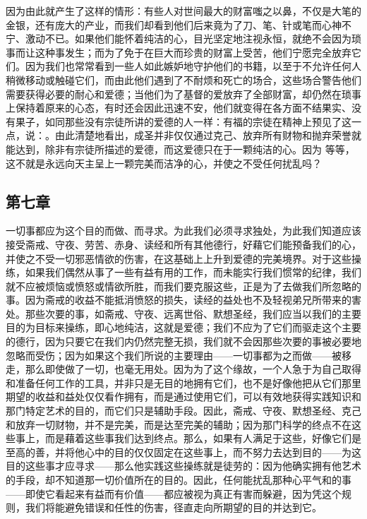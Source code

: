 因为由此就产生了这样的情形：有些人对世间最大的财富嗤之以鼻，不仅是大笔的金银，还有庞大的产业，而我们却看到他们后来竟为了刀、笔、针或笔而心神不宁、激动不已。如果他们能怀着纯洁的心，目光坚定地注视永恒，就绝不会因为琐事而让这种事发生；而为了免于在巨大而珍贵的财富上受苦，他们宁愿完全放弃它们。因为我们也常常看到一些人如此嫉妒地守护他们的书籍，以至于不允许任何人稍微移动或触碰它们，而由此他们遇到了不耐烦和死亡的场合，这些场合警告他们需要获得必要的耐心和爱德；当他们为了基督的爱放弃了全部财富，却仍然在琐事上保持着原来的心态，有时还会因此迅速不安，他们就变得在各方面不结果实、没有果子，如同那些没有宗徒所讲的爱德的人一样：有福的宗徒在精神上预见了这一点，说：。由此清楚地看出，成圣并非仅仅通过克己、放弃所有财物和抛弃荣誉就能达到，除非有宗徒所描述的爱德，而这爱德只在于一颗纯洁的心。因为 等等，这不就是永远向天主呈上一颗完美而洁净的心，并使之不受任何扰乱吗？\par


\subsection{第七章}

\par

一切事都应为这个目的而做、而寻求。为此我们必须寻求独处，为此我们知道应该接受斋戒、守夜、劳苦、赤身、读经和所有其他德行，好藉它们能预备我们的心，并使之不受一切邪恶情欲的伤害，在这基础上上升到爱德的完美境界。对于这些操练，如果我们偶然从事了一些有益有用的工作，而未能实行我们惯常的纪律，我们就不应被烦恼或愤怒或情欲所胜，而我们要克服这些，正是为了去做我们所忽略的事。因为斋戒的收益不能抵消愤怒的损失，读经的益处也不及轻视弟兄所带来的害处。那些次要的事，如斋戒、守夜、远离世俗、默想圣经，我们应当以我们的主要目的为目标来操练，即心地纯洁，这就是爱德；我们不应为了它们而驱走这个主要的德行，因为只要它在我们内仍然完整无损，我们就不会因那些次要的事被必要地忽略而受伤；因为如果这个我们所说的主要理由——一切事都为之而做——被移走，那么即使做了一切，也毫无用处。因为为了这个缘故，一个人急于为自己取得和准备任何工作的工具，并非只是无目的地拥有它们，也不是好像他把从它们那里期望的收益和益处仅仅看作拥有，而是通过使用它们，可以有效地获得实践知识和那门特定艺术的目的，而它们只是辅助手段。因此，斋戒、守夜、默想圣经、克己和放弃一切财物，并不是完美，而是达至完美的辅助；因为那门科学的终点不在这些事上，而是藉着这些事我们达到终点。那么，如果有人满足于这些，好像它们是至高的善，并将他心中的目的仅仅固定在这些事上，而不努力去达到目的——为这目的这些事才应寻求——那么他实践这些操练就是徒劳的：因为他确实拥有他艺术的手段，却不知道那一切价值所在的目的。因此，任何能扰乱那种心平气和的事——即使它看起来有益而有价值——都应被视为真正有害而躲避，因为凭这个规则，我们将能避免错误和任性的伤害，径直走向所期望的目的并达到它。\par

